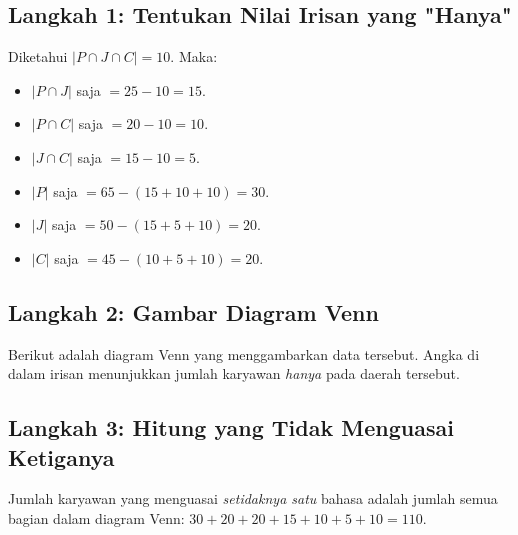 \documentclass[12pt,a4paper]{article}
\begin{document}
\subsection*{Langkah 1: Tentukan Nilai Irisan yang "Hanya"}
Diketahui $|P \cap J \cap C| = 10$. Maka:
\begin{itemize}
    \item $|P \cap J|$ saja $= 25 - 10 = 15$.
    \item $|P \cap C|$ saja $= 20 - 10 = 10$.
    \item $|J \cap C|$ saja $= 15 - 10 = 5$.
    \item $|P|$ saja $= 65 - (15 + 10 + 10) = 30$.
    \item $|J|$ saja $= 50 - (15 + 5 + 10) = 20$.
    \item $|C|$ saja $= 45 - (10 + 5 + 10) = 20$.
\end{itemize}

\subsection*{Langkah 2: Gambar Diagram Venn}
Berikut adalah diagram Venn yang menggambarkan data tersebut. Angka di dalam irisan menunjukkan jumlah karyawan \emph{hanya} pada daerah tersebut.

\begin{center}
\end{center}

\subsection*{Langkah 3: Hitung yang Tidak Menguasai Ketiganya}
Jumlah karyawan yang menguasai \emph{setidaknya satu} bahasa adalah jumlah semua bagian dalam diagram Venn:
$30 + 20 + 20 + 15 + 10 + 5 + 10 = 110$.
\end{document}
